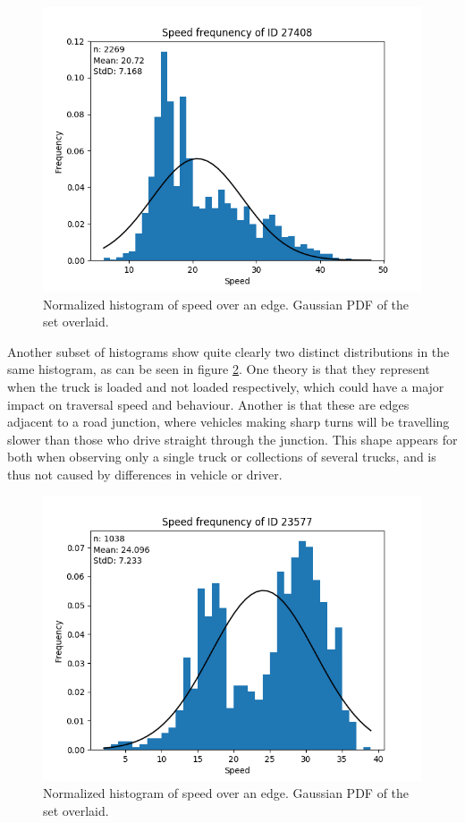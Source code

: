 \documentclass{article}
\begin{document}
				\begin{figure}[H]
					\includegraphics[scale=0.5]{logResEh2.png}
					\caption{Normalized histogram of speed over an edge. Gaussian PDF of the set overlaid.}
					\label{fig:logResEh2}
				\end{figure}

				Another subset of histograms show quite clearly two distinct distributions in the same histogram, as can be seen in figure \ref{fig:logResBad}. One theory is that they represent when the truck is loaded and not loaded respectively, which could have a major impact on traversal speed and behaviour. Another is that these are edges adjacent to a road junction, where vehicles making sharp turns will be travelling slower than those who drive straight through the junction. This shape appears for both when observing only a single truck or collections of several trucks, and is thus not caused by differences in vehicle or driver.

				\begin{figure}[H]
					\includegraphics[scale=0.5]{logResBad.png}
					\caption{Normalized histogram of speed over an edge. Gaussian PDF of the set overlaid.}
					\label{fig:logResBad}
				\end{figure}
\end{document}
